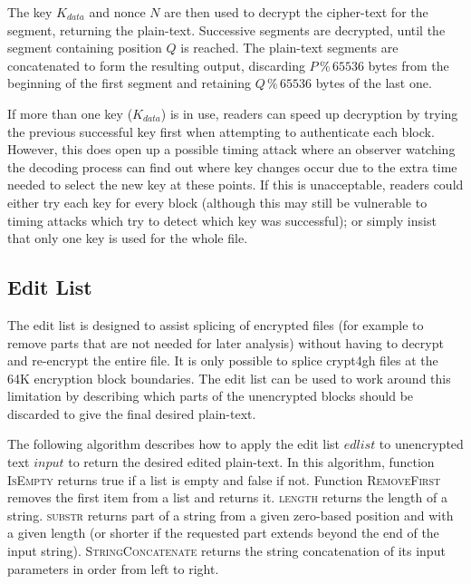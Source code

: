 \documentclass[10pt]{article}
\begin{document}
The key $K_{data}$ and nonce $N$ are then used to decrypt the cipher-text for the segment, returning the plain-text.
Successive segments are decrypted, until the segment containing position $Q$ is reached.
The plain-text segments are concatenated to form the resulting output, discarding $P \mathbin{\%} 65536$ bytes from
the beginning of the first segment and retaining $Q \mathbin{\%} 65536$ bytes of the last one.

If more than one key ($K_{data}$) is in use,
readers can speed up decryption by trying the previous successful key first when attempting to authenticate each block.
However, this does open up a possible timing attack where an observer watching the decoding process can find
out where key changes occur due to the extra time needed to select the new key at these points.
If this is unacceptable, readers could either try each key for every block (although this may still be vulnerable
to timing attacks which try to detect which key was successful); or simply insist that only one key is used for
the whole file.

\subsection{Edit List}\label{data:edit_list}

The edit list is designed to assist splicing of encrypted files (for example to remove parts that are not needed
for later analysis) without having to decrypt and re-encrypt the entire file.
It is only possible to splice crypt4gh files at the 64K encryption block boundaries.
The edit list can be used to work around this limitation by describing which parts of the unencrypted blocks
should be discarded to give the final desired plain-text.

The following algorithm describes how to apply the edit list $edlist$ to unencrypted text $input$ to return
the desired edited plain-text.
In this algorithm, function \textsc{IsEmpty} returns true if a list is empty and false if not.
Function \textsc{RemoveFirst} removes the first item from a list and returns it.
\textsc{length} returns the length of a string.
\textsc{substr} returns part of a string from a given zero-based position and with a given length (or shorter if the
requested part extends beyond the end of the input string).
\textsc{StringConcatenate} returns the string concatenation of its input parameters in order from left to right.
\end{document}
